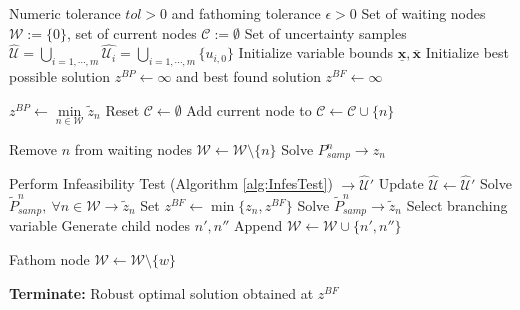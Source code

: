 \documentclass[sn-mathphys-num]{sn-jnl}
\begin{document}
\begin{algorithm}
\caption{The RsBB Algorithm}
\label{alg:RSBB}
\begin{algorithmic}[1] %
\Require Numeric tolerance $tol>0$ and fathoming tolerance $\epsilon>0$
    \Require Set of waiting nodes $\mathcal{W} := \{0\}$, set of current nodes $\mathcal{C} := \emptyset$
    \Require Set of uncertainty samples $\hat{\mathcal{U}}= \underset{i=1,\cdots,m}{\bigcup} \hat{\mathcal{U}_i}=\underset{i=1,\cdots,m}{\bigcup}  \{ u_{i,0}\}
   $
    \State Initialize variable bounds $\underline{\bm x},\overline{\bm x}$
    \State Initialize best possible solution $z^{BP} \gets \infty$ and best found solution $z^{BF} \gets \infty$

        \State $z^{BP} \gets \underset{n\in \mathcal{W}}{\min}{\tilde{z}_n}$
        \State Reset $\mathcal{C} \gets \emptyset$
                \State Add current node to $\mathcal{C} \gets \mathcal{C} \cup \{n\}$
            \EndIf
        \EndFor
        
            \State Remove $n$ from waiting nodes $\mathcal{W} \gets \mathcal{W} \setminus \{n\}$
            \State Solve $P_{samp}^n \rightarrow z_n$
            
                \State Perform Infeasibility Test (Algorithm \ref{alg:InfesTest}) $\rightarrow \hat{\mathcal{U}}'$
                    \State Update $\hat{\mathcal{U}} \gets \hat{\mathcal{U}}'$
                    \State Solve $\tilde{P}_{samp}^n,~ \forall n \in \mathcal{W} \rightarrow \tilde{z}_n $
                \EndIf
                \State Set $z^{BF} \gets \min\{z_n, z^{BF}\}$
                \State Solve $\tilde{P}^n_{samp} \rightarrow \tilde{z}_n$
                \State Select branching variable
                \State Generate child nodes $n', n''$
                \State Append $\mathcal{W} \gets \mathcal{W} \cup \{n',n''\}$
                
                        \State Fathom node $\mathcal{W} \gets \mathcal{W} \setminus \{w\}$
                    \EndIf
                \EndFor
            \EndIf
        \EndFor
    \EndWhile

    \State \textbf{Terminate:} Robust optimal solution obtained at $z^{BF}$
\end{algorithmic}
\end{algorithm}
\end{document}
